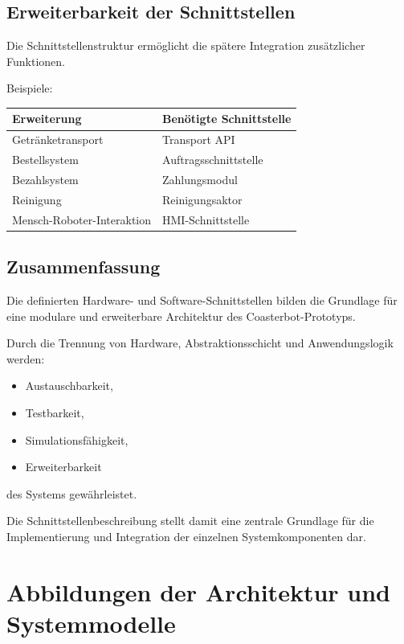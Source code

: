 \subsection{Erweiterbarkeit der
Schnittstellen}\label{erweiterbarkeit-der-schnittstellen}

Die Schnittstellenstruktur ermöglicht die spätere Integration
zusätzlicher Funktionen.

Beispiele:

\begin{longtable}[]{@{}ll@{}}
\toprule\noalign{}
Erweiterung & Benötigte Schnittstelle \\
\midrule\noalign{}
\endhead
\bottomrule\noalign{}
\endlastfoot
Getränketransport & Transport API \\
Bestellsystem & Auftragsschnittstelle \\
Bezahlsystem & Zahlungsmodul \\
Reinigung & Reinigungsaktor \\
Mensch-Roboter-Interaktion & HMI-Schnittstelle \\
\end{longtable}

\subsection{Zusammenfassung}\label{zusammenfassung-8}

Die definierten Hardware- und Software-Schnittstellen bilden die
Grundlage für eine modulare und erweiterbare Architektur des
Coasterbot-Prototyps.

Durch die Trennung von Hardware, Abstraktionsschicht und Anwendungslogik
werden:

\begin{itemize}
\tightlist
\item
  Austauschbarkeit,
\item
  Testbarkeit,
\item
  Simulationsfähigkeit,
\item
  Erweiterbarkeit
\end{itemize}

des Systems gewährleistet.

Die Schnittstellenbeschreibung stellt damit eine zentrale Grundlage für
die Implementierung und Integration der einzelnen Systemkomponenten dar.

\section{Abbildungen der Architektur und
Systemmodelle}\label{abbildungen-der-architektur-und-systemmodelle}

